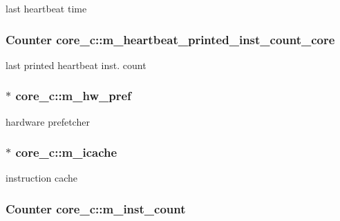 \label{classcore__c_ac39e45112af1b8690321132caf0c6aec}
last heartbeat time \hypertarget{classcore__c_a12d8fee9e07c3fb12f18ef862d66c529}{
\subsubsection[{m\_\-heartbeat\_\-printed\_\-inst\_\-count\_\-core}]{\setlength{\rightskip}{0pt plus 5cm}Counter {\bf core\_\-c::m\_\-heartbeat\_\-printed\_\-inst\_\-count\_\-core}}}
\label{classcore__c_a12d8fee9e07c3fb12f18ef862d66c529}
last printed heartbeat inst. count \hypertarget{classcore__c_a6015358ff17f7b469bed14a16c06e455}{
\subsubsection[{m\_\-hw\_\-pref}]{$\ast$ {\bf core\_\-c::m\_\-hw\_\-pref}}}
\label{classcore__c_a6015358ff17f7b469bed14a16c06e455}
hardware prefetcher \hypertarget{classcore__c_a103da306f4d8d3357ede4d8e2fe05b7f}{
\subsubsection[{m\_\-icache}]{$\ast$ {\bf core\_\-c::m\_\-icache}}}
\label{classcore__c_a103da306f4d8d3357ede4d8e2fe05b7f}
instruction cache \hypertarget{classcore__c_a4a92fed13bf3f6becb873ce1921acb4a}{
\subsubsection[{m\_\-inst\_\-count}]{\setlength{\rightskip}{0pt plus 5cm}Counter {\bf core\_\-c::m\_\-inst\_\-count}}}
